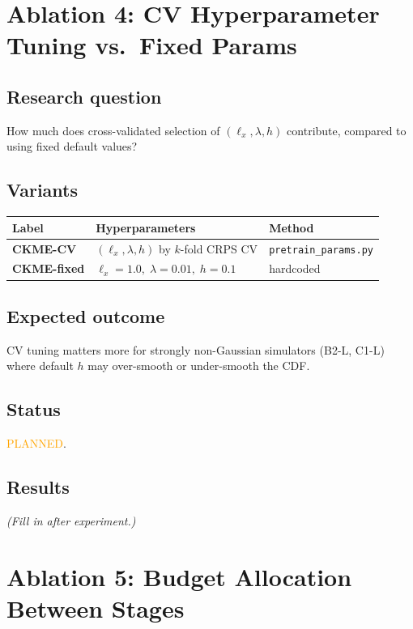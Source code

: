 \documentclass[11pt]{article}
\begin{document}
\section{Ablation 4: CV Hyperparameter Tuning vs.\ Fixed Params}
\label{sec:abl4}

\subsection*{Research question}
How much does cross-validated selection of $(\ell_x, \lambda, h)$
contribute, compared to using fixed default values?

\subsection*{Variants}

\begin{center}
\begin{tabular}{lll}
  \toprule
  Label & Hyperparameters & Method \\
  \midrule
  \textbf{CKME-CV} & $(\ell_x, \lambda, h)$ by $k$-fold CRPS CV & \texttt{pretrain\_params.py} \\
  \textbf{CKME-fixed} & $\ell_x = 1.0,\; \lambda = 0.01,\; h = 0.1$ & hardcoded \\
  \bottomrule
\end{tabular}
\end{center}

\subsection*{Expected outcome}
CV tuning matters more for strongly non-Gaussian simulators
(B2-L, C1-L) where default $h$ may over-smooth or under-smooth the CDF.

\subsection*{Status}
\textcolor{orange}{PLANNED}.

\subsection*{Results}
\textit{(Fill in after experiment.)}

\section{Ablation 5: Budget Allocation Between Stages}
\label{sec:abl5}
\end{document}
